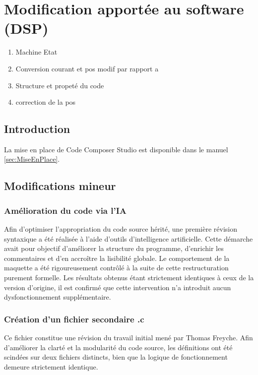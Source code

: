 \chapter{Modification apportée au software (DSP)}

\begin{enumerate}
    \item Machine Etat
    \item Conversion courant et pos modif par rapport a
    \item Structure et propeté du code
    \item correction de la pos
\end{enumerate}

\section{Introduction}



La mise en place de Code Composer Studio est disponible dans le manuel \autoref{sec:MiseEnPlace}.

\section{Modifications mineur}
\subsection{Amélioration du code via l'IA}
Afin d'optimiser l'appropriation du code source hérité, une première révision syntaxique a été réalisée à l'aide d'outils d'intelligence artificielle. Cette démarche avait pour objectif d'améliorer la structure du programme, d'enrichir les commentaires et d'en accroître la lisibilité globale. Le comportement de la maquette a été rigoureusement contrôlé à la suite de cette restructuration purement formelle. Les résultats obtenus étant strictement identiques à ceux de la version d'origine, il est confirmé que cette intervention n'a introduit aucun dysfonctionnement supplémentaire.

\subsection{Création d'un fichier secondaire .c}
Ce fichier constitue une révision du travail initial mené par Thomas Freyche. Afin d'améliorer la clarté et la modularité du code source, les définitions ont été scindées sur deux fichiers distincts, bien que la logique de fonctionnement demeure strictement identique.

